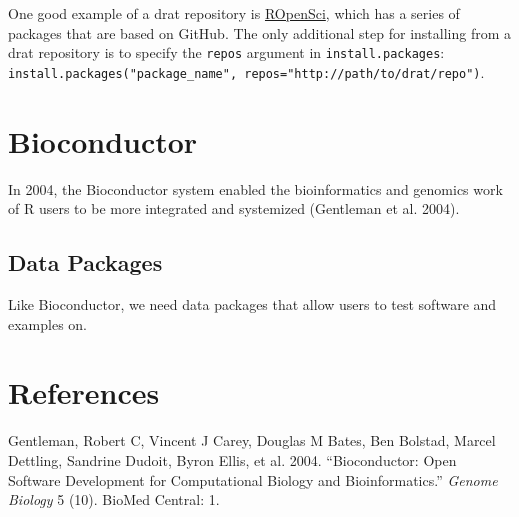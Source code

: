 \documentclass[]{elsarticle} %
\begin{document}
One good example of a drat repository is
\href{https://ropensci.org/}{ROpenSci}, which has a series of packages
that are based on GitHub. The only additional step for installing from a
drat repository is to specify the \texttt{repos} argument in
\texttt{install.packages}:
\texttt{install.packages("package\_name",\ repos="http://path/to/drat/repo")}.

\section{Bioconductor}\label{bioconductor}

In 2004, the Bioconductor system enabled the bioinformatics and genomics
work of R users to be more integrated and systemized (Gentleman et al.
2004).

\subsection{Data Packages}\label{data-packages}

Like Bioconductor, we need data packages that allow users to test
software and examples on.

\section*{References}\label{references}

\hypertarget{refs}{}
\hypertarget{ref-gentleman2004bioconductor}{}
Gentleman, Robert C, Vincent J Carey, Douglas M Bates, Ben Bolstad,
Marcel Dettling, Sandrine Dudoit, Byron Ellis, et al. 2004.
``Bioconductor: Open Software Development for Computational Biology and
Bioinformatics.'' \emph{Genome Biology} 5 (10). BioMed Central: 1.
\end{document}
